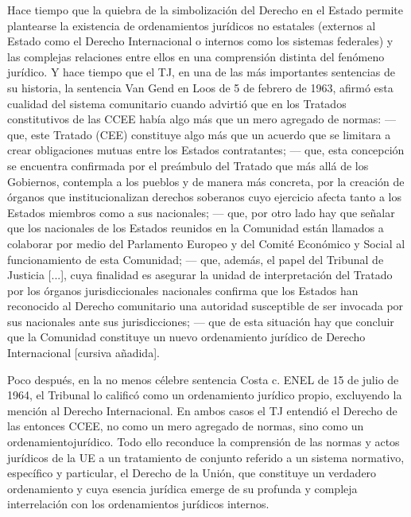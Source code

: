 \documentclass[10pt,a4paper]{article}
\begin{document}
Hace tiempo que la quiebra de la simbolización del Derecho en el Estado permite plantearse la existencia de ordenamientos jurídicos no estatales (externos al Estado como el Derecho Internacional o internos como los sistemas federales) y las complejas relaciones entre ellos en una comprensión distinta del fenómeno jurídico. Y hace tiempo que el TJ, en una de las más importantes sentencias de su historia, la sentencia Van Gend en Loos de 5 de febrero de 1963, afirmó esta cualidad del sistema comunitario cuando advirtió que en los Tratados constitutivos de las CCEE había algo más que un mero agregado de normas:
— que, este Tratado (CEE) constituye algo más que un acuerdo que se limitara a crear obligaciones mutuas entre los Estados contratantes;
— que, esta concepción se encuentra confirmada por el preámbulo del Tratado que más allá de los Gobiernos, contempla a los pueblos y de manera más concreta, por la creación de órganos que institucionalizan derechos soberanos cuyo ejercicio afecta tanto a los Estados miembros como a sus nacionales;
— que, por otro lado hay que señalar que los nacionales de los Estados reunidos en la Comunidad están llamados a colaborar por medio del Parlamento Europeo y del Comité Económico y Social al funcionamiento de esta Comunidad;
— que, además, el papel del Tribunal de Justicia [...], cuya finalidad es asegurar la unidad de interpretación del Tratado por los órganos jurisdiccionales nacionales confirma que los Estados han reconocido al Derecho comunitario una autoridad susceptible de ser invocada por sus nacionales ante sus jurisdicciones;
— que de esta situación hay que concluir que la Comunidad constituye un nuevo ordenamiento jurídico de Derecho Internacional [cursiva añadida]. 

Poco después, en la no menos célebre sentencia Costa c. ENEL de 15 de julio de 1964, el Tribunal lo calificó como un ordenamiento jurídico propio, excluyendo la mención al Derecho Internacional. En ambos casos el TJ entendió el Derecho de las entonces CCEE, no como un mero agregado de normas, sino como un ordenamientojurídico. Todo ello reconduce la comprensión de las normas y actos jurídicos de la UE a un tratamiento de conjunto referido a un sistema normativo, específico y particular, el Derecho de la Unión, que constituye un verdadero ordenamiento y cuya esencia jurídica emerge de su profunda y compleja interrelación con los ordenamientos jurídicos internos.
\end{document}
